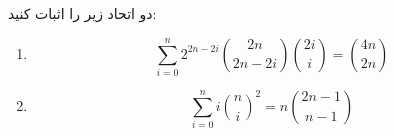     دو اتحاد زیر را اثبات کنید:
    \begin{enumerate}
        \item 
        $$\sum\limits_{i=0}^{n} 2^{2n-2i} \binom{2n}{2n-2i} \binom{2i}{i} = \binom{4n}{2n}$$
        \item
        $$ \sum\limits_{i=0}^{n} i {\binom{n}{i}}^2 = n\binom{2n-1}{n-1}$$
    \end{enumerate}